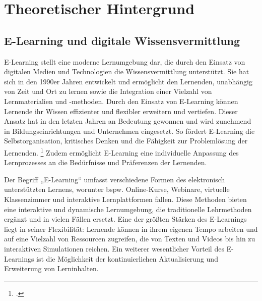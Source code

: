 \chapter{Theoretischer Hintergrund}
\section{E-Learning und digitale Wissensvermittlung}
E-Learning stellt eine moderne Lernumgebung dar, die durch den Einsatz von digitalen Medien und Technologien die Wissensvermittlung unterstützt.
Sie hat sich in den 1990er Jahren entwickelt und ermöglicht den Lernenden, unabhängig von Zeit und Ort zu lernen sowie die Integration einer Vielzahl von Lernmaterialien und -methoden.
Durch den Einsatz von E-Learning können Lernende ihr Wissen effizienter und flexibler erweitern und vertiefen.
Dieser Ansatz hat in den letzten Jahren an Bedeutung gewonnen und wird zunehmend in Bildungseinrichtungen und Unternehmen eingesetzt.
So fördert E-Learning die Selbstorganisation, kritisches Denken und die Fähigkeit zur Problemlösung der Lernenden.
\footcite[Vgl.][S. 203 f.]{jethroELearningItsEffects2012}
Zudem ermöglicht E-Learning eine individuelle Anpassung des Lernprozesses an die Bedürfnisse und Präferenzen der Lernenden.

Der Begriff „E-Learning“ umfasst verschiedene Formen des elektronisch unterstützten Lernens, worunter bspw. Online-Kurse, Webinare, virtuelle Klassenzimmer und interaktive Lernplattformen fallen.
Diese Methoden bieten eine interaktive und dynamische Lernumgebung, die traditionelle Lehrmethoden ergänzt und in vielen Fällen ersetzt.
Eine der größten Stärken des E-Learnings liegt in seiner Flexibilität: Lernende können in ihrem eigenen Tempo arbeiten und auf eine Vielzahl von Ressourcen zugreifen, die von Texten und Videos bis hin zu interaktiven Simulationen reichen.
Ein weiterer wesentlicher Vorteil des E-Learnings ist die Möglichkeit der kontinuierlichen Aktualisierung und Erweiterung von Lerninhalten. 

